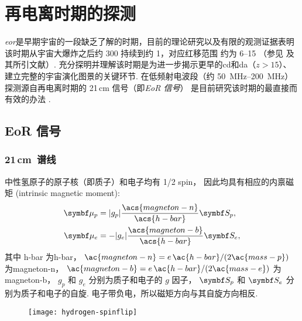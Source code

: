 
\chapter{再电离时期的探测}
\label{chap:detection}


\emph{\acf{eor}}是早期宇宙的一段缺乏了解的时期，目前的理论研究以及有限的观测证据表明
该时期从宇宙大爆炸之后约 \SI{300}{\Myr} 持续到约 \SI{1}{\Gyr}，对应红移范围
约为 \numrange{6}{15} （参见  及其所引文献）.
充分探明并理解该时期是为进一步揭示更早的\ac{cd}和\ac{da}（$z > 15$）、
建立完整的宇宙演化图景的关键环节.
在低频射电波段（约 \SIrange{50}{200}{\MHz}）
探测源自再电离时期的 21\,cm 信号（即\emph{EoR 信号}）
是目前研究该时期的最直接而有效的办法 \cite{madau1997,tozzi2000,furlanetto2006}.


\section{EoR 信号}
\label{sec:eor-signal}

\subsection{21\texorpdfstring{\,}{ }cm~谱线}
\label{sec:21cm-line}

中性氢原子的原子核（即质子）和电子均有 1/2 \ac{spin}，
因此均具有相应的内禀磁矩 (intrinsic magnetic moment):
\begin{align}
  \B{\mu}_p & = |g_p| \frac{\acs{magneton-n}}{\acs{h-bar}} \B{S}_p , \\
  \B{\mu}_e & = - |g_e| \frac{\acs{magneton-b}}{\acs{h-bar}} \B{S}_e ,
\end{align}
其中
\ac{h-bar} 为\acl{h-bar}，
$\ac{magneton-n} = e \,\ac{h-bar} / (2 \ac{mass-p})$ 为\acl{magneton-n}，
$\ac{magneton-b} = e \,\ac{h-bar} / (2 \ac{mass-e})$ 为 \acl{magneton-b}，
$g_p$ 和 $g_e$ 分别为质子和电子的 $g$ 因子，
$\B{S}_p$ 和 $\B{S}_e$ 分别为质子和电子的自旋.
电子带负电，所以磁矩方向与其自旋方向相反.

\begin{figure}[tbp]
  \centering
  \texttt{[image: hydrogen-spinflip]}
  \label{fig:hi-spinflip}
\end{figure}

